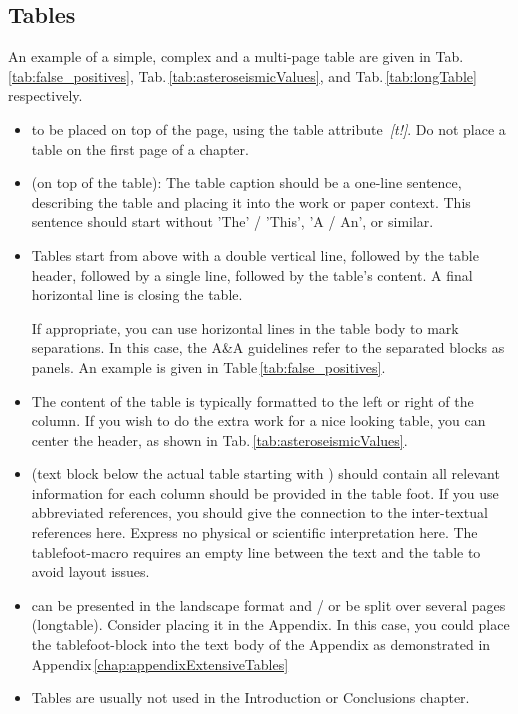 \subsection*{Tables}
\noindent
An example of a simple, complex and a multi-page table are given in Tab.\,\ref{tab:false_positives}, Tab.\,\ref{tab:asteroseismicValues}, and Tab.\,\ref{tab:longTable} respectively.

\begin{itemize}
    \item {} to be placed on top of the page, using the table attribute~\textit{[t!]}. Do not place a table on the first page of a chapter.%
    
    \item {} (on top of the table): The table caption should be a one-line sentence, describing the table and placing it into the work or paper context. This sentence should start without 'The' / 'This', 'A / An', or similar.
    
    \item {} Tables start from above with a double vertical line, followed by the table header, followed by a single line, followed by the table's content. A final horizontal line is closing the table. 
    
    If appropriate, you can use horizontal lines in the table body to mark separations. In this case, the A\&A guidelines refer to the separated blocks as panels. An example is given in  Table\,\ref{tab:false_positives}.
    
    \item The content of the table is typically formatted to the left or right of the column. If you wish to do the extra work for a nice looking table, you can center the header, as shown in Tab.\,\ref{tab:asteroseismicValues}.

    \item {} (text block below the actual table starting with ) should contain all relevant information for each column should be provided in the table foot. If you use abbreviated references, you should give the connection to the inter-textual references here. Express no physical or scientific interpretation here. The tablefoot-macro requires an empty line between the text and the table to avoid layout issues.
    
    \item {} can be presented in the landscape format and / or be split over several pages (longtable). Consider placing it in the Appendix. In this case, you could place the tablefoot-block into the text body of the Appendix as demonstrated in Appendix\,\ref{chap:appendixExtensiveTables}
    
    \item Tables are usually not used in the Introduction or Conclusions chapter.
\end{itemize}

